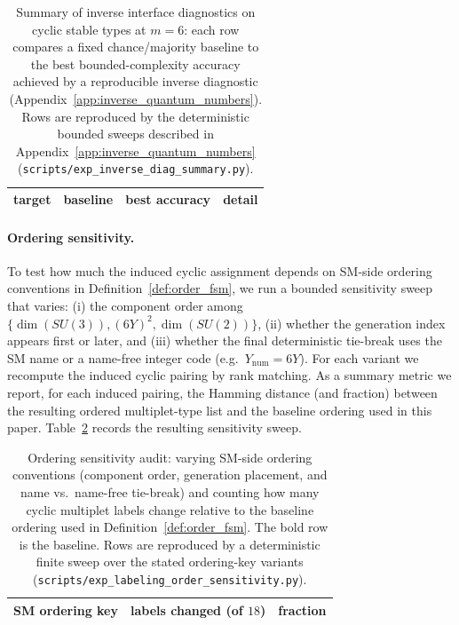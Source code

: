 \begin{table}[t]
\centering
\small
\setlength{\tabcolsep}{10pt}
\renewcommand{\arraystretch}{1.15}
\begin{tabular}{lccc}
\toprule
target & baseline & best accuracy & detail \\
\midrule
%
\end{tabular}
\caption{Summary of inverse interface diagnostics on cyclic stable types at $m=6$: each row compares a fixed chance/majority baseline to the best bounded-complexity accuracy achieved by a reproducible inverse diagnostic (Appendix~\ref{app:inverse_quantum_numbers}).
Rows are reproduced by the deterministic bounded sweeps described in Appendix~\ref{app:inverse_quantum_numbers} (\texttt{scripts/exp\_inverse\_diag\_summary.py}).}
\label{tab:inverse_diag_summary}
\end{table}

\paragraph{Ordering sensitivity.}
To test how much the induced cyclic assignment depends on SM-side ordering conventions in Definition~\ref{def:order_fsm}, we run a bounded sensitivity sweep that varies:
(i) the component order among $\{\dim(SU(3)),(6Y)^2,\dim(SU(2))\}$,
(ii) whether the generation index appears first or later,
and (iii) whether the final deterministic tie-break uses the SM name or a name-free integer code (e.g.\ $Y_{\mathrm{num}}=6Y$).
For each variant we recompute the induced cyclic pairing by rank matching.
As a summary metric we report, for each induced pairing, the Hamming distance (and fraction) between the resulting ordered multiplet-type list and the baseline ordering used in this paper.
Table~\ref{tab:labeling_order_sensitivity} records the resulting sensitivity sweep.

\begin{table}[t]
\centering
\small
\setlength{\tabcolsep}{8pt}
\renewcommand{\arraystretch}{1.15}
\begin{tabular}{lrr}
\toprule
SM ordering key & labels changed (of $18$) & fraction \\
\midrule
%
\end{tabular}
\caption{Ordering sensitivity audit: varying SM-side ordering conventions (component order, generation placement, and name vs.\ name-free tie-break) and counting how many cyclic multiplet labels change relative to the baseline ordering used in Definition~\ref{def:order_fsm}. The bold row is the baseline.
Rows are reproduced by a deterministic finite sweep over the stated ordering-key variants (\texttt{scripts/exp\_labeling\_order\_sensitivity.py}).}
\label{tab:labeling_order_sensitivity}
\end{table}

